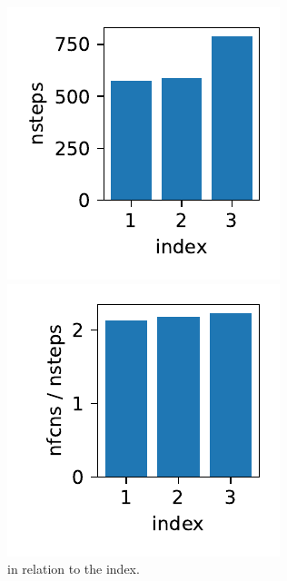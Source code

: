 \documentclass{report}
\begin{document}
\begin{figure}[h]
\centering
\begin{minipage}[t]{0.3\textwidth}
\centering
\includegraphics[width=\textwidth]{../Plots/Project2_main/Figure_600}
\caption{ in relation to the index.}
\label{pl:nsteps_indx123}
\end{minipage}
\hfill
\begin{minipage}[t]{0.3\textwidth}
\centering
\includegraphics[width=\textwidth]{../Plots/Project2_main/Figure_610}

\end{minipage}
\end{figure}
\end{document}
